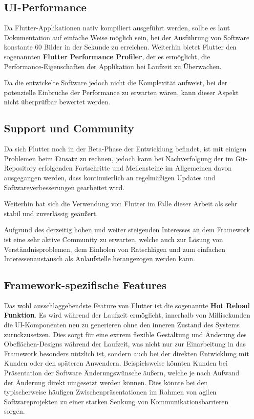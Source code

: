 \documentclass[bibliography=totoc,listof=totoc,BCOR=5mm,DIV=12,oneside]{scrbook}
\begin{document}
{\subsection{UI-Performance}
\par Da Flutter-Applikationen nativ kompiliert ausgeführt werden, sollte es laut Dokumentation auf einfache Weise möglich sein, bei der Ausführung von Software konstante 60 Bilder in der Sekunde zu erreichen\citep{Flu3}. Weiterhin bietet Flutter den sogenannten \textbf{Flutter Performance Profiler}\citep{FlutterPerformanceProfiler}, der es ermöglicht, die Performance-Eigenschaften der Applikation bei Laufzeit zu Überwachen. 
\par \bigskip Da die entwickelte Software jedoch nicht die Komplexität aufweist, bei der potenzielle Einbrüche der Performance zu erwarten wären, kann dieser Aspekt nicht überprüfbar bewertet werden.

\subsection{Support und Community}
\par Da sich Flutter noch in der Beta-Phase der Entwicklung befindet, ist mit einigen Problemen beim Einsatz zu rechnen, jedoch kann bei Nachverfolgung der im Git-Repository erfolgenden Fortschritte und Meilensteine im Allgemeinen davon ausgegangen werden, dass kontinuierlich an regelmäßigen Updates und Softwareverbesserungen gearbeitet wird.
\par \bigskip Weiterhin hat sich die Verwendung von Flutter im Falle dieser Arbeit als sehr stabil und zuverlässig geäußert.
\par \bigskip Aufgrund des derzeitig hohen und weiter steigenden Interesses an dem Framework ist eine sehr aktive Community zu erwarten, welche auch zur Lösung von Verständnisproblemen, dem Einholen von Ratschlägen und zum einfachen Interessenaustausch als Anlaufstelle herangezogen werden kann.

\subsection{Framework-spezifische Features}
\par Das wohl ausschlaggebendste Feature von Flutter ist die sogenannte \textbf{Hot Reload Funktion}. Es wird während der Laufzeit ermöglicht, innerhalb von Millisekunden die UI-Komponenten neu zu generieren ohne den inneren Zustand des Systems zurückzusetzen. Dies sorgt für eine extrem flexible Gestaltung und Änderung des Obeflächen-Designs während der Laufzeit, was nicht nur zur Einarbeitung in das Framework besonders nützlich ist, sondern auch bei der direkten Entwicklung mit Kunden oder den späteren Anwendern. Beispielsweise könnten Kunden bei Präsentation der Software Änderungswünsche äußern, welche je nach Aufwand der Änderung direkt umgesetzt werden können. Dies könnte bei den typischerweise häufigen Zwischenpräsentationen im Rahmen von agilen Softwareprojekten zu einer starken Senkung von Kommunikationsbarrieren sorgen.

}
\end{document}
